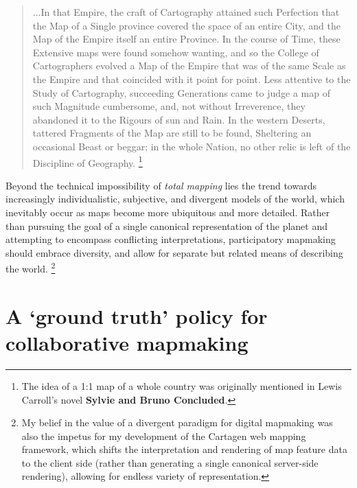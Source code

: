\documentclass[11pt,oneside,notitlepage]{report}
\begin{document}
{{\begin{quote}
...In that Empire, the craft of Cartography attained such Perfection that the Map of a Single province covered the space of an entire City, and the Map of the Empire itself an entire Province. In the course of Time, these Extensive maps were found somehow wanting, and so the College of Cartographers evolved a Map of the Empire that was of the same Scale as the Empire and that coincided with it point for point. Less attentive to the Study of Cartography, succeeding Generations came to judge a map of such Magnitude cumbersome, and, not without Irreverence, they abandoned it to the Rigours of sun and Rain. In the western Deserts, tattered Fragments of the Map are still to be found, Sheltering an occasional Beast or beggar; in the whole Nation, no other relic is left of the Discipline of Geography.
\cite{borges1946exactitude} \footnote{The idea of a 1:1 map of a whole country was originally mentioned in Lewis Carroll's novel \textbf{Sylvie and Bruno Concluded}.} 
\end{quote}

Beyond the technical impossibility of \emph{total mapping} lies the trend towards increasingly individualistic, subjective, and divergent models of the world, which inevitably occur as maps become more ubiquitous and more detailed. Rather than pursuing the goal of a single canonical representation of the planet and attempting to encompass conflicting interpretations, participatory mapmaking should embrace diversity, and allow for separate but related means of describing the world. \footnote{My belief in the value of a divergent paradigm for digital mapmaking was also the impetus for my development of the Cartagen web mapping framework, which shifts the interpretation and rendering of map feature data to the client side (rather than generating a single canonical server-side rendering), allowing for endless variety of representation.} 

\section{A `ground truth' policy for collaborative mapmaking}
\label{sec:groundtruth}

}}
\end{document}
